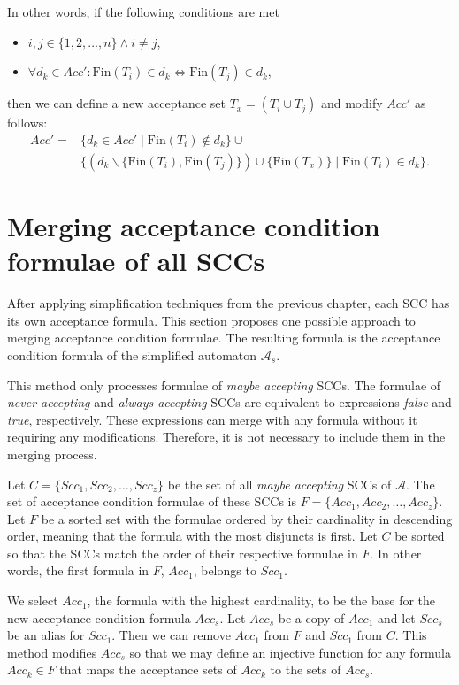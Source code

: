 \documentclass[
  digital, %
  twoside, %
  table,   %
  lof,     %
  lot,     %
]{fithesis3}
\begin{document}
In other words, if the following conditions are met
\begin{itemize}
  \item $i, j \in \{1, 2, \dots, n\} \wedge i \neq j$,
  \item $\forall d_k \in Acc' \colon \text{Fin}(T_i) \in d_k \Leftrightarrow \text{Fin}(T_j) \in d_k$,
\end{itemize}
then we can define a new acceptance set $T_x = (T_i \cup T_j)$ and modify $Acc'$ as follows: 
\begin{align*}
  Acc' =& \{d_k \in Acc' \mid \text{Fin}(T_i) \notin d_k\} \cup \\ &\{(d_k \smallsetminus \{\text{Fin}(T_i), \text{Fin}(T_j)\}) \cup \{\text{Fin}(T_x)\} \mid \text{Fin}(T_i) \in d_k\}.
\end{align*}

\section{Merging acceptance condition formulae of all SCCs}
\label{sec:merging_formulae}
After applying simplification techniques from the previous chapter, each SCC has its own acceptance formula. This section proposes one possible approach to merging acceptance condition formulae. The resulting formula is the acceptance condition formula of the simplified automaton $\mathcal{A}_s$.

This method only processes formulae of \emph{maybe accepting} SCCs. The formulae of \emph{never accepting} and \emph{always accepting} SCCs are equivalent to expressions \emph{false} and \emph{true}, respectively. These expressions can merge with any formula without it requiring any modifications. Therefore, it is not necessary to include them in the merging process. 

Let $C = \{Scc_1, Scc_2, \dots, Scc_z\}$ be the set of all \emph{maybe accepting} SCCs of $\mathcal{A}$. The set of acceptance condition formulae of these SCCs is $F = \{Acc_1, Acc_2, \dots, Acc_z\}$. Let $F$ be a sorted set with the formulae ordered by their cardinality in descending order, meaning that the formula with the most disjuncts is first. Let $C$ be sorted so that the SCCs match the order of their respective formulae in $F$. In other words, the first formula in $F$, $Acc_1$, belongs to $Scc_1$.

We select $Acc_1$, the formula with the highest cardinality, to be the base for the new acceptance condition formula $Acc_s$. Let $Acc_s$ be a copy of $Acc_1$ and let $Scc_s$ be an alias for $Scc_1$. Then we can remove $Acc_1$ from $F$ and $Scc_1$ from $C$. This method modifies $Acc_s$ so that we may define an injective function for any formula $Acc_k \in F$ that maps the acceptance sets of $Acc_k$ to the sets of $Acc_s$. 
\end{document}
